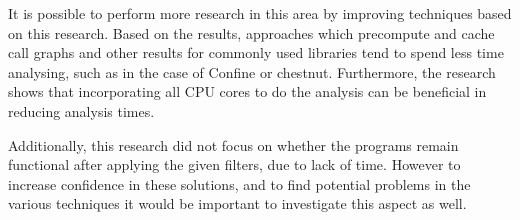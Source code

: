 It is possible to perform more research in this area by improving techniques based on this research.
Based on the results, approaches which precompute and cache call graphs and other results for commonly used libraries tend to spend less time analysing, such as in the case of Confine or chestnut.
Furthermore, the research shows that incorporating all CPU cores to do the analysis can be beneficial in reducing analysis times.

Additionally, this research did not focus on whether the programs remain functional after applying the given filters, due to lack of time.
However to increase confidence in these solutions, and to find potential problems in the various techniques it would be important to investigate this aspect as well.
